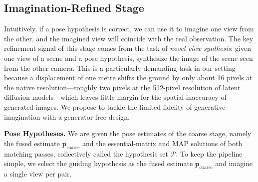 \subsection{Imagination-Refined Stage}
\label{sec:refine}
Intuitively, if a pose hypothesis is correct, we can use it to imagine one view from the other, and the imagined view will coincide with the real observation. The key refinement signal of this stage comes from the task of \emph{novel view synthesis}: given one view of a scene and a pose hypothesis, synthesize the image of the scene seen from the other camera. This is a particularly demanding task in our setting because a displacement of one metre shifts the ground by only about 16 pixels at the native resolution---roughly two pixels at the 512-pixel resolution of latent diffusion models---which leaves little margin for the spatial inaccuracy of generated images. We propose to tackle the limited fidelity of generative imagination with a generator-free design.

\noindent\textbf{Pose Hypotheses.}\label{heuristic}
We are given the pose estimates of the coarse stage, namely the fused estimate $\mathbf{p}_{\text{coarse}}$ and the essential-matrix and MAP solutions of both matching passes, collectively called the hypothesis set $\mathcal{P}$. To keep the pipeline simple, we select the guiding hypothesis as the fused estimate $\mathbf{p}_{\text{coarse}}$ and imagine a single view per pair.

